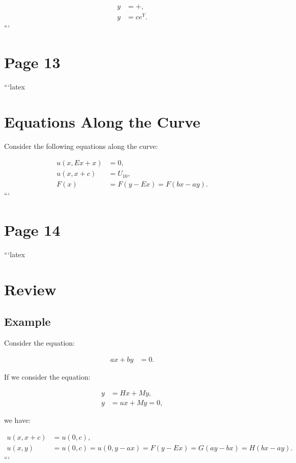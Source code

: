 \documentclass[11pt]{article}
\begin{document}
\begin{align}
    y &= +, \\
    y &= c e^Y.
\end{align}
```
\clearpage
\section*{Page 13}

```latex
\section*{Equations Along the Curve}

Consider the following equations along the curve:

\begin{align}
    u(x, Ex + x) &= 0, \\
    u(x, x + c) &= U_{10}, \\
    F(x) &= F(y - Ex) = F(bx - ay).
\end{align}
```
\clearpage
\section*{Page 14}

```latex
\section*{Review}

\subsection*{Example}

Consider the equation:

\begin{align}
    ax + by &= 0.
\end{align}

If we consider the equation:

\begin{align}
    y &= Hx + My, \\
    y &= ux + My = 0,
\end{align}

we have:

\begin{align}
    u(x, x + c) &= u(0, c), \\
    u(x, y) &= u(0, c) = u(0, y - ax) = F(y - Ex) = G(ay - bx) = H(bx - ay).
\end{align}
```
\clearpage
\end{document}
